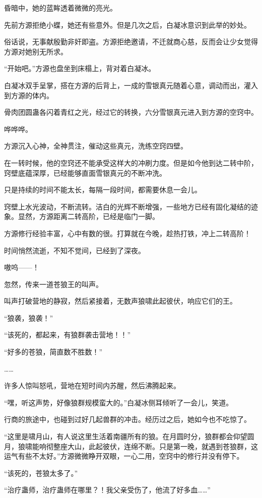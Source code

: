 \begin{this_body}
昏暗中，她的蓝眸透着微微的亮光。

先前方源拒绝小蝶，她还有些意外。但是几次之后，白凝冰意识到此举的妙处。

俗话说，无事献殷勤非奸即盗。方源拒绝邀请，不迁就商心慈，反而会让少女觉得方源对她别无所求。

“开始吧。”方源也盘坐到床榻上，背对着白凝冰。

白凝冰双手呈掌，搭在方源的后背上，一成的雪银真元随着心意，调动而出，灌入到方源的体内。

骨肉团圆蛊各闪着青红之光，经过它的转换，六分雪银真元进入到方源的空窍中。

哗哗哗。

方源沉入心神，全神贯注，催动这些真元，洗练空窍四壁。

在一转时候，他的空窍还不能承受这样大的冲刷力度。但是如今他到达二转中阶，窍壁底蕴深厚，已经能够直面雪银真元的不断冲洗。

只是持续的时间不能太长，每隔一段时间，都需要休息一会儿。

窍壁上水光波动，不断流转。洁白的光辉不断增强，一些地方已经有固化凝结的迹象。显然，方源距离二转高阶，已经是临门一脚。

方源修行经验丰富，心中有数的很。打算就在今晚，趁热打铁，冲上二转高阶！

时间悄然流逝，不知不觉间，已经到了深夜。

嗷呜——！

忽然，传来一道苍狼王的叫声。

叫声打破营地的静寂，然后紧接着，无数声狼啸此起彼伏，响应它们的王。

“狼袭，狼袭！”

“该死的，都起来，有狼群袭击营地！！”

“好多的苍狼，简直数不胜数！”

……

许多人惊叫怒吼，营地在短时间内苏醒，然后沸腾起来。

“嘿，听这声势，好像狼群规模蛮大的。”白凝冰侧耳倾听了一会儿，笑道。

行商的旅途中，也碰到过好几起兽群的冲击。经历过之后，她如今也不吃惊了。

“这里是啸月山，有人说这里生活着南疆所有的狼。在月圆时分，狼群都会仰望圆月，狼啸能响彻整座大山，此起彼伏，连绵不断。只是第一晚，就遇到苍狼群，这运气有些不太好。”方源微微睁开双眼，一心二用，空窍中的修行并没有停下。

“该死的，苍狼太多了。”

“治疗蛊师，治疗蛊师在哪里？！我父亲受伤了，他流了好多血……”


\end{this_body}
